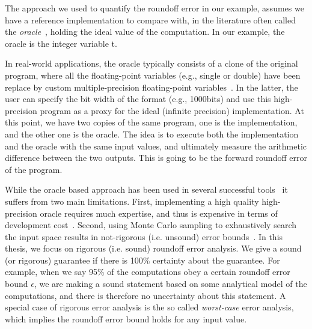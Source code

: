 %
%

The approach we used to quantify the roundoff error in our example, assumes we have a reference implementation to compare with, in the literature often called the \emph{oracle}~\cite{blame}, holding the ideal value of the computation.
%
In our example, the oracle is the integer variable t.
% 

In real-world applications, the oracle typically consists of a clone of the original program, where all the floating-point variables (e.g., single or double) have been replace by custom multiple-precision floating-point variables~\cite{mpfr}.
%
In the latter, the user can specify the bit width of the format (e.g., 1000bits) and use this high-precision program as a proxy for the ideal (infinite precision) implementation.
%
At this point, we have two copies of the same program, one is the implementation, and the other one is the oracle. 
%
The idea is to execute both the implementation and the oracle with the same input values, and ultimately measure the arithmetic difference between the two outputs. 
%
This is going to be the forward roundoff error of the program. 
%

While the oracle based approach has been used in several successful tools~\cite{landau2014guide, kahan1996improbability, atomic, blame, herbie} it suffers from two main limitations.
%
First, implementing a high quality high-precision oracle requires much expertise, and thus is expensive in terms of development cost~\cite{atomic}.
%
Second, using Monte Carlo sampling to exhaustively search the input space results in not-rigorous (i.e. unsound) error bounds~\cite{glasserman2013monte, parker2000monte}.
%
In this thesis, we focus on rigorous (i.e. sound) roundoff error analysis.
%
We give a sound (or rigorous) guarantee if there is 100\% certainty about the guarantee.
%
%
For example, when we say 95\% of the computations obey a certain roundoff error bound $\epsilon$, we are making a sound statement based on some analytical model of the computations, and there is therefore no uncertainty about this statement.
%
A special case of rigorous error analysis is the so called \emph{worst-case} error analysis, which implies the roundoff error bound holds for any input value.

